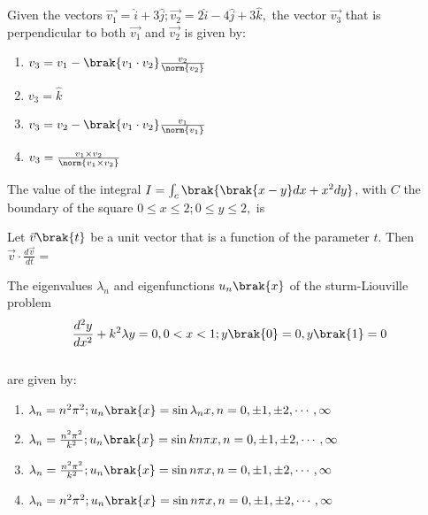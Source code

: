 \iffalse
\chapter{2017}
\author{AI24BTECH11020}
\section{ae}
\fi

\item Given the vectors $\vec{v_1}=\hat{i}+3\hat{j};\vec{v_2}=2\hat{i}-4\hat{j}+3\hat{k},$ the vector $\vec{v_3}$ that is perpendicular to both $\vec{v_1}$ and $\vec{v_2}$ is given by:
		\begin{enumerate}
	\item $v_3=v_1-\brak{v_1\cdot v_2}\frac{v_2}{\norm{v_2}}$
	\item $v_3=\hat{k}$
	\item $v_3=v_2-\brak{v_1\cdot v_2}\frac{v_1}{\norm{v_1}}$
	\item $v_3=\frac{v_1\times v_2}{\norm{v_1\times v_2}}$
		\end{enumerate}
\item The value of the integral $I=\int_c\brak{\brak{x-y}dx+x^2dy}$, with $C$ the boundary of the square $0\leq x\leq 2;0\leq y\leq 2,$ is \underline{\hspace{2cm}}

\item Let $\vec{v}\brak{t}$ be a unit vector that is a function of the parameter $t$. Then $\vec{v}\cdot\frac{d\vec{v}}{dt}=$ \underline{\hspace{2cm}}

\item The eigenvalues $\lambda_n$ and eigenfunctions $u_n\brak{x}$ of the sturm-Liouville problem $$\frac{d^2y}{dx^2}+k^2\lambda y=0, 0<x<1; y\brak{0}=0,y\brak{1}=0$$\\
		are given by:
 \begin{enumerate}
	 \item $\lambda_n=n^2\pi^2;u_n\brak{x}=\sin\lambda_nx,   n=0,\pm1,\pm2,\cdots,\infty$
	 \item $\lambda_n=\frac{n^2\pi^2}{k^2};u_n\brak{x}=\sin kn\pi x,   n=0,\pm1,\pm2,\cdots,\infty$
	 \item $\lambda_n=\frac{n^2\pi^2}{k^2};u_n\brak{x}=\sin n\pi x,   n=0,\pm1,\pm2,\cdots,\infty$
	 \item $\lambda_n=n^2\pi^2;u_n\brak{x}=\sin n\pi x,   n=0,\pm1,\pm2,\cdots,\infty$
 \end{enumerate}

